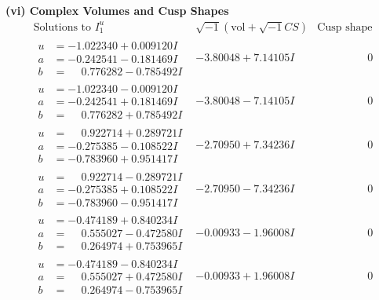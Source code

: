 \documentclass[1p]{elsarticle_modified}
\theoremstyle{definition}
\newcommand{\I}{\sqrt{-1}}
\begin{document}
\newpage\flushleft \textbf{(vi) Complex Volumes and Cusp Shapes}
$$\begin{array}{c|c|c}  
\text{Solutions to }I^u_{1}& \I (\text{vol} + \sqrt{-1}CS) & \text{Cusp shape}\\
 \hline 
\begin{aligned}
u &= -1.022340 + 0.009120 I \\
a &= -0.242541 - 0.181469 I \\
b &= \phantom{-}0.776282 - 0.785492 I\end{aligned}
 & -3.80048 + 7.14105 I & \phantom{-0.000000 } 0 \\ \hline\begin{aligned}
u &= -1.022340 - 0.009120 I \\
a &= -0.242541 + 0.181469 I \\
b &= \phantom{-}0.776282 + 0.785492 I\end{aligned}
 & -3.80048 - 7.14105 I & \phantom{-0.000000 } 0 \\ \hline\begin{aligned}
u &= \phantom{-}0.922714 + 0.289721 I \\
a &= -0.275385 - 0.108522 I \\
b &= -0.783960 + 0.951417 I\end{aligned}
 & -2.70950 + 7.34236 I & \phantom{-0.000000 } 0 \\ \hline\begin{aligned}
u &= \phantom{-}0.922714 - 0.289721 I \\
a &= -0.275385 + 0.108522 I \\
b &= -0.783960 - 0.951417 I\end{aligned}
 & -2.70950 - 7.34236 I & \phantom{-0.000000 } 0 \\ \hline\begin{aligned}
u &= -0.474189 + 0.840234 I \\
a &= \phantom{-}0.555027 - 0.472580 I \\
b &= \phantom{-}0.264974 + 0.753965 I\end{aligned}
 & -0.00933 - 1.96008 I & \phantom{-0.000000 } 0 \\ \hline\begin{aligned}
u &= -0.474189 - 0.840234 I \\
a &= \phantom{-}0.555027 + 0.472580 I \\
b &= \phantom{-}0.264974 - 0.753965 I\end{aligned}
 & -0.00933 + 1.96008 I & \phantom{-0.000000 } 0 \\ \hline\begin{aligned}

\end{aligned}
\end{array}$$
\end{document}
